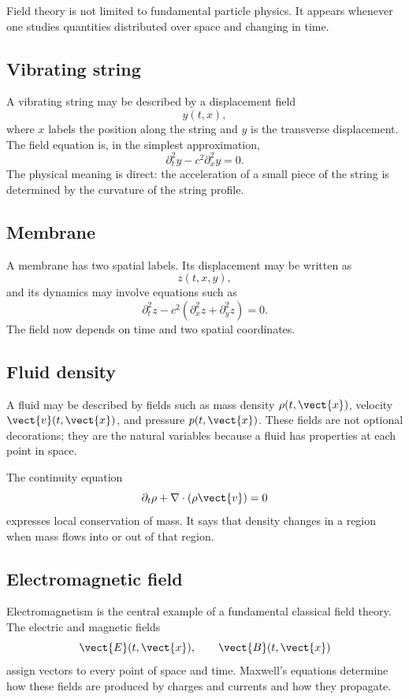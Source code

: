 Field theory is not limited to fundamental particle physics. It appears whenever
one studies quantities distributed over space and changing in time.

\subsection*{Vibrating string}

A vibrating string may be described by a displacement field
\[
    y(t,x),
\]
where \(x\) labels the position along the string and \(y\) is the transverse
displacement. The field equation is, in the simplest approximation,
\[
    \partial_t^2 y - c^2\partial_x^2 y = 0.
\]
The physical meaning is direct: the acceleration of a small piece of the string
is determined by the curvature of the string profile.

\subsection*{Membrane}

A membrane has two spatial labels. Its displacement may be written as
\[
    z(t,x,y),
\]
and its dynamics may involve equations such as
\[
    \partial_t^2 z - c^2(\partial_x^2 z + \partial_y^2 z)=0.
\]
The field now depends on time and two spatial coordinates.

\subsection*{Fluid density}

A fluid may be described by fields such as mass density \(\rho(t,\vect{x})\),
velocity \(\vect{v}(t,\vect{x})\), and pressure \(p(t,\vect{x})\). These fields
are not optional decorations; they are the natural variables because a fluid has
properties at each point in space.

The continuity equation
\[
    \partial_t \rho + \nabla\cdot(\rho\vect{v}) = 0
\]
expresses local conservation of mass. It says that density changes in a region
when mass flows into or out of that region.

\subsection*{Electromagnetic field}

Electromagnetism is the central example of a fundamental classical field theory.
The electric and magnetic fields
\[
    \vect{E}(t,\vect{x}), \qquad \vect{B}(t,\vect{x})
\]
assign vectors to every point of space and time. Maxwell's equations determine
how these fields are produced by charges and currents and how they propagate.

